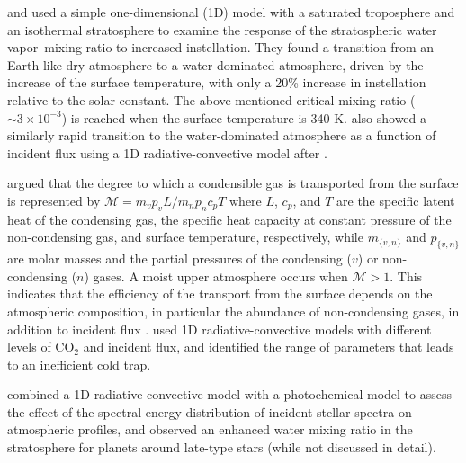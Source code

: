 \documentclass[11pt,numberedappendix,twocolappendix,]{emulateapj}
\newcommand{\yf}[1]{{\color{orange}#1}}
\newcommand{\wv}{water vapor\ }
\begin{document}
\citet{Kasting1993} and \citet{Kopparapu2013} used a simple one-dimensional (1D) model with a saturated troposphere and an isothermal stratosphere to examine the response of the stratospheric \wv mixing ratio to increased instellation. 
They found a transition from an Earth-like dry atmosphere to a water-dominated atmosphere, driven by the increase of the surface temperature, with only a 20\% increase in instellation relative to the solar constant. 
The above-mentioned critical mixing ratio ($\sim 3 \times 10^{-3}$) is reached when the surface temperature is 340 K. 
\yf{\citet{Kodama2015} also showed a similarly rapid transition to the water-dominated atmosphere as a function of incident flux using a 1D radiative-convective model after \citet{Abe1988}. }

\citet{Wordsworth2013,Wordsworth2014} argued that the degree to which a condensible gas is transported from the surface is represented by $\mathcal{M} = m_v p_v L / m_n p_n c_p T $ where $L$, $c_p$, and $T$ are the specific latent heat of the condensing gas, the specific heat capacity at constant pressure of the non-condensing gas, and surface  temperature, respectively, while $m_{\{v,n\}}$ and $p_{\{v,n\}}$ are molar masses and the partial pressures of the  condensing ($v$) or non-condensing ($n$) gases. 
A moist upper atmosphere occurs when $\mathcal{M} > 1$. 
This indicates that the efficiency of the transport from the surface depends on the atmospheric composition, in particular the abundance of non-condensing gases, in addition to incident flux \citep{Wordsworth2014}. 
\citet{Wordsworth2013} used 1D radiative-convective models with different levels of CO$_2$ and incident flux, and identified the range of parameters that leads to an inefficient cold trap. 


\citet{Rugheimer2013,Rugheimer2015} combined a 1D radiative-convective model with a photochemical model to assess the effect of the spectral energy distribution of incident stellar spectra on atmospheric profiles, and observed an enhanced water mixing ratio in the stratosphere for planets around late-type stars (while not discussed in detail). 
\end{document}
